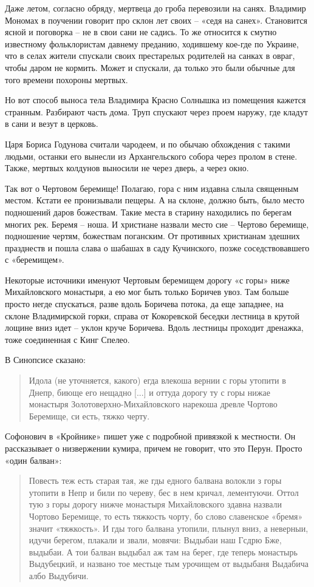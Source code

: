 Даже летом, согласно обряду, мертвеца до гроба перевозили на санях. Владимир Мономах в поучении говорит про склон лет своих – «седя на санех». Становится ясной и поговорка – не в свои сани не садись. То же относится к смутно известному фольклористам давнему преданию, ходившему кое-где по Украине, что в селах жители спускали своих престарелых родителей на санках в овраг, чтобы даром не кормить. Может и спускали, да только это были обычные для того времени похороны мертвых.

Но вот способ выноса тела Владимира Красно Солнышка из помещения кажется странным. Разбирают часть дома. Труп спускают через проем наружу, где кладут в сани и везут в церковь.

Царя Бориса Годунова считали чародеем, и по обычаю обхождения с такими людьми, останки его вынесли из Архангельского собора через пролом в стене. Также, мертвых колдунов выносили не через дверь, а через окно.

Так вот о Чертовом беремище! Полагаю, гора с ним издавна слыла священным местом. Кстати ее пронизывали пещеры. А на склоне, должно быть, было место подношений даров божествам. Такие места в старину находились по берегам многих рек. Беремя – ноша. И христиане назвали место сие – Чертово беремище, подношение чертям, божествам поганским. От противных христианам здешних празднеств и пошла слава о шабашах в саду Кучинского, позже соседствовавшего с «беремищем».

Некоторые источники именуют Чертовым беремищем дорогу «с горы» ниже Михайловского монастыря, а ею мог быть только Боричев увоз. Там больше просто негде спускаться, разве вдоль Боричева потока, да еще западнее, на склоне Владимирской горки, справа от Кокоревской беседки лестница в крутой лощине вниз идет – уклон круче Боричева. Вдоль лестницы проходит дренажка, тоже соединенная с Кинг Спелео.

В Синопсисе\cite{sinopsis} сказано:

\begin{quotation}
Идола (не уточняется, какого) егда влекоша вернии с горы утопити в Днепр, биюще его нещадно [...] и оттуда дорогу ту с горы нижае монастыря Золотоверхно-Михайловского нарекоша древле Чортово Беремище, си есть, тяжко черту.
\end{quotation}

Софонович в «Кройнике» пишет уже с подробной привязкой к местности. Он рассказывает о низвержении кумира, причем не говорит, что это Перун. Просто «один балван»:

\begin{quotation}
Повесть теж есть старая тая, же гды едного балвана волокли з горы утопити в Непр и били по череву, бес в нем кричал, лементуючи. Оттол тую з горы дорогу нижче монастыря Михайловского здавна назвали Чортово Беремище, то есть тяжкость чорту, бо слово славенское «бремя» значит «тяжкость». И гды того балвана утопили, плынул вниз, а неверныи, идучи берегом, плакали и звали, мовячи: Выдыбаи наш Гсдрю Бже, выдыбаи. А тои балван выдыбал аж там на берег, где теперь монастырь Выдубецкий, и названо тое местьце тым урочищем от выдыбаня Выдабича албо Выдубичи.
\end{quotation}

